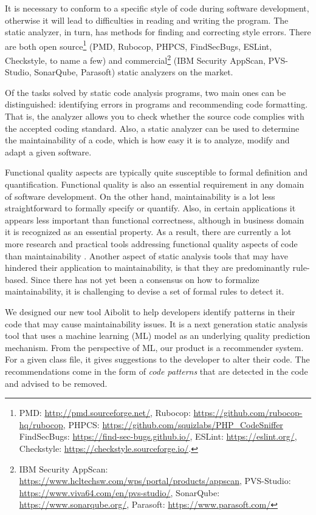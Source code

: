 It is necessary to conform to a specific style of code during software development, otherwise it will lead to difficulties in reading and writing the program. The static analyzer, in turn, has methods for finding and correcting style errors. There are both open source\footnote{PMD: \url{http://pmd.sourceforge.net/}, Rubocop: \url{https://github.com/rubocop-hq/rubocop},
PHPCS: \url{https://github.com/squizlabs/PHP_CodeSniffer}
FindSecBugs: \url{https://find-sec-bugs.github.io/}, ESLint: \url{https://eslint.org/}, Checkstyle: \url{https://checkstyle.sourceforge.io/}.}
(PMD, Rubocop, PHPCS, FindSecBugs, ESLint, Checkstyle, to name a few) and commercial\footnote{IBM Security AppScan: \url{https://www.hcltechsw.com/wps/portal/products/appscan},
PVS-Studio: \url{https://www.viva64.com/en/pvs-studio/},
SonarQube: \url{https://www.sonarqube.org/},
Parasoft: \url{https://www.parasoft.com/}}
(IBM Security AppScan, PVS-Studio, SonarQube, Parasoft) static analyzers
on the market.

Of the tasks solved by static code analysis programs, two main ones can be distinguished: identifying errors
in programs and recommending code formatting. That is, the analyzer allows you to check whether the source
code complies with the accepted coding standard. Also, a static analyzer can be used to determine the
maintainability of a code, which is how easy it is to analyze, modify and adapt a given software.

Functional quality aspects are typically quite susceptible to formal definition
and quantification.
Functional quality is also an essential
requirement in any domain of software development. On the other hand,
maintainability is a lot less straightforward to formally specify or quantify.
Also, in certain applications it appears less important than
functional correctness, although in business domain it is recognized as an
essential property.
As a result, there are currently a lot more
research and practical tools addressing functional quality aspects of code than
maintainability \citep{Overview_Static_Code_Analysis_in_Software_Development}.
Another aspect of static analysis tools that may have hindered their application
to maintainability, is that they are predominantly rule-based. Since there has
not yet been a consensus on how to formalize maintainability, it is challenging
to devise a set of formal rules to detect it.

We designed our new tool Aibolit to help developers identify patterns in their
code  that may cause maintainability issues. It is a next generation static
analysis tool that uses a machine learning (ML) model as an underlying quality
prediction mechanism. From the perspective of ML, our product is a recommender
system. For a given class file, it gives suggestions to the developer to alter
their code. The recommendations come in the form of \textit{code patterns} that
are detected in the code and advised to be removed.

